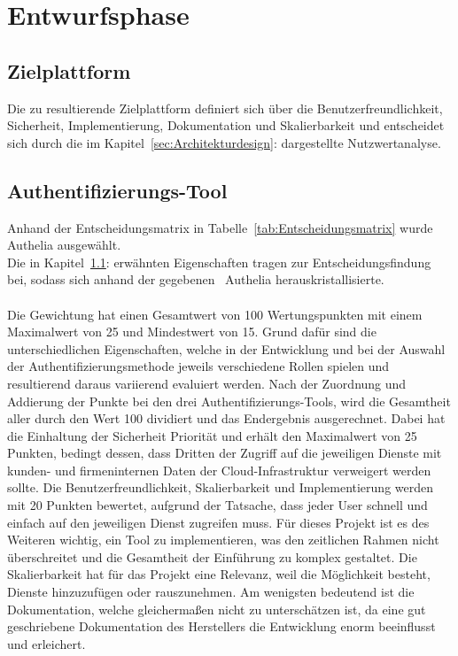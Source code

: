 \section{Entwurfsphase} 
\label{sec:Entwurfsphase}

\subsection{Zielplattform}
\label{sec:Zielplattform}
Die zu resultierende Zielplattform definiert sich über die Benutzerfreundlichkeit, Sicherheit, Implementierung, 
Dokumentation und Skalierbarkeit und entscheidet sich durch die im Kapitel~\ref{sec:Architekturdesign}:  
dargestellte Nutzwertanalyse.


\subsection{Authentifizierungs-Tool}
\label{sec:Authentifizierungs-Tool}
Anhand der Entscheidungsmatrix in Tabelle~\ref{tab:Entscheidungsmatrix} wurde Authelia ausgewählt. 
\\Die in Kapitel~\ref{sec:Zielplattform}:  erwähnten Eigenschaften tragen zur Entscheidungsfindung bei, sodass 
sich anhand der gegebenen~ Authelia herauskristallisierte.
\\
\\Die Gewichtung hat einen Gesamtwert von 100 Wertungspunkten mit einem Maximalwert von 25 und Mindestwert von 15. Grund dafür sind die 
unterschiedlichen Eigenschaften, welche in der Entwicklung und bei der Auswahl der Authentifizierungsmethode jeweils verschiedene Rollen 
spielen und resultierend daraus variierend evaluiert werden. Nach der Zuordnung und Addierung der Punkte bei den drei Authentifizierungs-Tools, 
wird die Gesamtheit aller durch den Wert 100 dividiert und das Endergebnis ausgerechnet. Dabei hat die Einhaltung der Sicherheit Priorität und 
erhält den Maximalwert von 25 Punkten, bedingt dessen, dass Dritten der Zugriff auf die jeweiligen Dienste mit kunden- und firmeninternen Daten 
der Cloud-Infrastruktur verweigert werden sollte. 
Die Benutzerfreundlichkeit, Skalierbarkeit und Implementierung werden mit 20 Punkten bewertet, aufgrund der Tatsache, dass jeder User schnell und 
einfach auf den jeweiligen Dienst zugreifen muss. Für dieses Projekt ist es des Weiteren wichtig, ein Tool zu implementieren, was den 
zeitlichen Rahmen nicht überschreitet und die Gesamtheit der Einführung zu komplex gestaltet. Die Skalierbarkeit hat für das Projekt eine 
Relevanz, weil die Möglichkeit besteht, Dienste hinzuzufügen oder rauszunehmen. Am wenigsten bedeutend ist die Dokumentation, welche 
gleichermaßen nicht zu unterschätzen ist, da eine gut geschriebene Dokumentation des Herstellers die Entwicklung enorm beeinflusst und erleichert.

